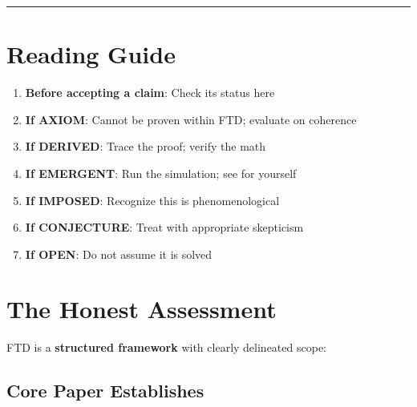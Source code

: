 \documentclass[
  11pt,
  letterpaper,
  twoside,
  openany]{book}
\makeatletter
\providecommand{\tightlist}{%
  \setlength{\itemsep}{0pt}\setlength{\parskip}{0pt}}
\let\orig@section\section
\renewcommand{\section}{\needspace{8\baselineskip}\orig@section}
\let\orig@subsection\subsection
\renewcommand{\subsection}{\needspace{6\baselineskip}\orig@subsection}
\makeatother
\begin{document}
\begin{center}\rule{0.5\linewidth}{0.5pt}\end{center}

\section{Reading Guide}\label{reading-guide-1}

\begin{tcolorbox}[enhanced jigsaw, colbacktitle=quarto-callout-tip-color!10!white, titlerule=0mm, bottomtitle=1mm, bottomrule=.15mm, colback=white, arc=.35mm, breakable, toprule=.15mm, title=\textcolor{quarto-callout-tip-color}{\faLightbulb}\hspace{0.5em}{How to Use This Ledger}, rightrule=.15mm, coltitle=black, leftrule=.75mm, colframe=quarto-callout-tip-color-frame, toptitle=1mm, opacityback=0, opacitybacktitle=0.6, left=2mm]

\begin{enumerate}
\def\labelenumi{\arabic{enumi}.}
\tightlist
\item
  \textbf{Before accepting a claim}: Check its status here
\item
  \textbf{If AXIOM}: Cannot be proven within FTD; evaluate on coherence
\item
  \textbf{If DERIVED}: Trace the proof; verify the math
\item
  \textbf{If EMERGENT}: Run the simulation; see for yourself
\item
  \textbf{If IMPOSED}: Recognize this is phenomenological
\item
  \textbf{If CONJECTURE}: Treat with appropriate skepticism
\item
  \textbf{If OPEN}: Do not assume it is solved
\end{enumerate}

\end{tcolorbox}

\section{The Honest Assessment}\label{the-honest-assessment}

FTD is a \textbf{structured framework} with clearly delineated scope:

\subsection{Core Paper Establishes}\label{core-paper-establishes}
\end{document}
